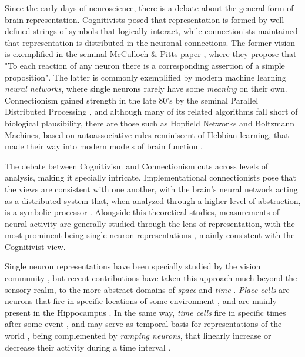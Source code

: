     Since the early days of neuroscience, there is a debate about the general form of brain representation. Cognitivists posed that representation is formed by well defined strings of symbols that logically interact, while connectionists maintained that representation is distributed in the neuronal connections. The former vision is exemplified in the seminal McCulloch \& Pitts paper \cite{mcculloch1943logical}, where they propose that "To each reaction of any neuron there is a corresponding assertion of a simple proposition". The latter is commonly exemplified by modern machine learning \textit{neural networks}, where single neurons rarely have some \textit{meaning} on their own. Connectionism gained strength in the late 80's by the seminal Parallel Distributed Processing \cite{mcclelland1986parallel}, and although many of its related algorithms fall short of biological plausibility, there are those such as Hopfield Networks and Boltzmann Machines, based on autoassociative rules reminiscent of Hebbian learning, that made their way into modern models of brain function \cite{mceliece1987capacity}. 

    The debate between Cognitivism and Connectionism cuts across levels of analysis, making it specially intricate. Implementational connectionists pose that the views are consistent with one another, with the brain's neural network acting as a distributed system that, when analyzed through a higher level of abstraction, is a symbolic processor \cite{bechtel1988connectionism}. Alongside this theoretical studies, measurements of neural activity are generally studied through the lens of representation, with the most prominent being single neuron representations \cite{quiroga2005invariant}, mainly consistent with the Cognitivist view.

    Single neuron representations have been specially studied by the vision community \cite{deyoe1988concurrent, bell1997independent, ito2004representation, lee2008sparse}, but recent contributions have taken this approach much beyond the sensory realm, to the more abstract domains of \textit{space} and \textit{time} \cite{eichenbaum2014time}. \textit{Place cells} are neurons that fire in specific locations of some environment \cite{foster2006reverse}, and are mainly present in the Hippocampus \cite{o1979review}. In the same way, \textit{time cells} fire in specific times after some event \cite{tiganj2016sequential, eichenbaum2014time}, and may serve as temporal basis for representations of the world \cite{ludvig2008stimulus}, being complemented by \textit{ramping neurons}, that linearly increase or decrease their activity during a time interval \cite{morrison2009convergence, kim2013neural, tiganj2016sequential, parker2016timing}.

